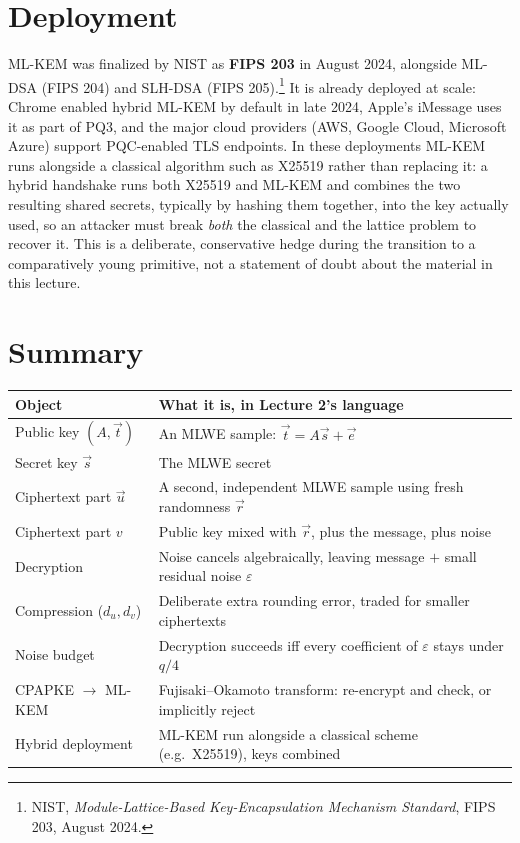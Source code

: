 \section{Deployment}
\label{sec:L3:deployment-status}

ML-KEM was finalized by NIST as \textbf{FIPS 203} in August 2024, alongside ML-DSA (FIPS 204) and SLH-DSA (FIPS 205).\footnote{NIST, \emph{Module-Lattice-Based Key-Encapsulation Mechanism Standard}, FIPS 203, August 2024.} It is already deployed at scale: Chrome enabled hybrid ML-KEM by default in late 2024, Apple's iMessage uses it as part of PQ3, and the major cloud providers (AWS, Google Cloud, Microsoft Azure) support PQC-enabled TLS endpoints. In these deployments ML-KEM runs alongside a classical algorithm such as X25519 rather than replacing it: a hybrid handshake runs both X25519 and ML-KEM and combines the two resulting shared secrets, typically by hashing them together, into the key actually used, so an attacker must break \emph{both} the classical and the lattice problem to recover it. This is a deliberate, conservative hedge during the transition to a comparatively young primitive, not a statement of doubt about the material in this lecture.

\section{Summary}
\label{sec:L3:summary-table}

\begin{center}
\renewcommand{\arraystretch}{1.3}
\begin{tabular}{|l|l|}
\hline
\textbf{Object} & \textbf{What it is, in Lecture 2's language} \\
\hline
Public key $(A,\vec t)$ & An MLWE sample: $\vec t = A\vec s+\vec e$ \\
Secret key $\vec s$ & The MLWE secret \\
Ciphertext part $\vec u$ & A second, independent MLWE sample using fresh randomness $\vec r$ \\
Ciphertext part $v$ & Public key mixed with $\vec r$, plus the message, plus noise \\
Decryption & Noise cancels algebraically, leaving message $+$ small residual noise $\varepsilon$ \\
Compression ($d_u,d_v$) & Deliberate extra rounding error, traded for smaller ciphertexts \\
Noise budget & Decryption succeeds iff every coefficient of $\varepsilon$ stays under $q/4$ \\
CPAPKE $\to$ ML-KEM & Fujisaki--Okamoto transform: re-encrypt and check, or implicitly reject \\
Hybrid deployment & ML-KEM run alongside a classical scheme (e.g.\ X25519), keys combined \\
\hline
\end{tabular}
\end{center}

